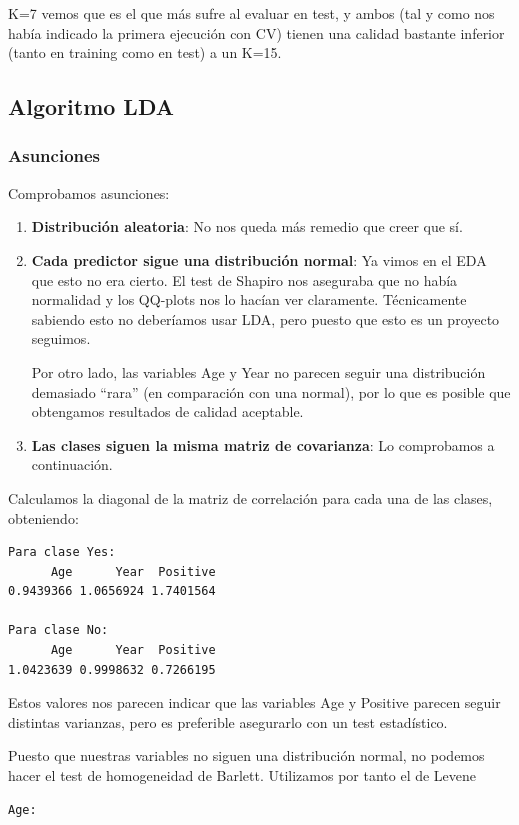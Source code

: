 K=7 vemos que es el que más sufre al evaluar en test, y ambos (tal y como nos había indicado la primera ejecución con CV) tienen una calidad bastante inferior (tanto en training como en test) a un K=15.

\subsection{Algoritmo LDA}
\subsubsection{Asunciones}
Comprobamos asunciones:
\begin{enumerate}
    \item \textbf{Distribución aleatoria}: No nos queda más remedio que creer que sí.
    \item \textbf{Cada predictor sigue una distribución normal}: Ya vimos en el EDA que esto no era cierto. El test de Shapiro nos aseguraba que no había normalidad y los QQ-plots nos lo hacían ver claramente. Técnicamente sabiendo esto no deberíamos usar LDA, pero puesto que esto es un proyecto seguimos.
    
    Por otro lado, las variables Age y Year no parecen seguir una distribución demasiado ``rara'' (en comparación con una normal), por lo que es posible que obtengamos resultados de calidad aceptable.
    \item \textbf{Las clases siguen la misma matriz de covarianza}: Lo comprobamos a continuación.
\end{enumerate}

Calculamos la diagonal de la matriz de correlación para cada una de las clases, obteniendo:
\begin{verbatim}
Para clase Yes:
      Age      Year  Positive 
0.9439366 1.0656924 1.7401564 

Para clase No:
      Age      Year  Positive 
1.0423639 0.9998632 0.7266195 
\end{verbatim}

\vspace{\baselineskip}

Estos valores nos parecen indicar que las variables Age y Positive parecen seguir distintas varianzas, pero es preferible asegurarlo con un test estadístico.

Puesto que nuestras variables no siguen una distribución normal, no podemos hacer el test de homogeneidad de Barlett. Utilizamos por tanto el de Levene
\begin{verbatim}
Age:
\end{verbatim}

